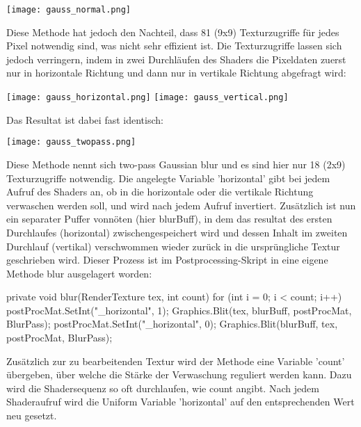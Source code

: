 \texttt{[image: gauss\_normal.png]}

Diese Methode hat jedoch den Nachteil, dass 81 (9x9) Texturzugriffe für jedes Pixel notwendig sind, was nicht sehr effizient ist.
Die Texturzugriffe lassen sich jedoch verringern, indem in zwei Durchläufen des Shaders die Pixeldaten zuerst nur in horizontale Richtung und dann nur in vertikale Richtung abgefragt wird:

\texttt{[image: gauss\_horizontal.png]}
\texttt{[image: gauss\_vertical.png]}

Das Resultat ist dabei fast identisch: 

\texttt{[image: gauss\_twopass.png]}

Diese Methode nennt sich two-pass Gaussian blur und es sind hier nur 18 (2x9) Texturzugriffe notwendig. Die angelegte Variable 'horizontal' gibt bei jedem Aufruf des Shaders an, ob in die horizontale oder die vertikale Richtung verwaschen werden soll, und wird nach jedem Aufruf invertiert. Zusätzlich ist nun ein separater Puffer vonnöten (hier blurBuff), in dem das resultat des ersten Durchlaufes (horizontal) zwischengespeichert wird und dessen Inhalt im zweiten Durchlauf (vertikal) verschwommen wieder zurück in die ursprüngliche Textur geschrieben wird. Dieser Prozess ist im Postprocessing-Skript in eine eigene Methode blur ausgelagert worden:

\begin{csh}
    private void blur(RenderTexture tex, int count)
    {
        for (int i = 0; i < count; i++)
        {
            postProcMat.SetInt("_horizontal", 1);
            Graphics.Blit(tex, blurBuff, postProcMat, BlurPass);
            postProcMat.SetInt("_horizontal", 0);
            Graphics.Blit(blurBuff, tex, postProcMat, BlurPass);
        }
    }
\end{csh}

Zusätzlich zur zu bearbeitenden Textur wird der Methode eine Variable 'count' übergeben, über welche die Stärke der Verwaschung reguliert werden kann. Dazu wird die Shadersequenz so oft durchlaufen, wie count angibt. Nach jedem Shaderaufruf wird die Uniform Variable 'horizontal' auf den entsprechenden Wert neu gesetzt.

